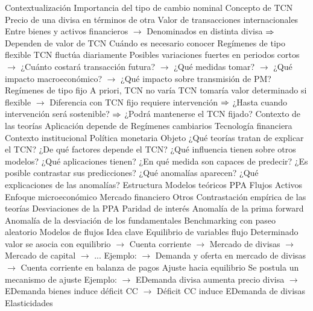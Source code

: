 \documentclass{nuevotema}
\begin{document}
\begin{esquemal}
	\1[] 
		\2 Contextualización
			\3 Importancia del tipo de cambio nominal
				\4 Concepto de TCN
				\4[] Precio de una divisa en términos de otra
				\4 Valor de transacciones internacionales
				\4[] Entre bienes y activos financieros
				\4[] $\to$ Denominados en distinta divisa
				\4[] $\Rightarrow$ Dependen de valor de TCN
			\3 Cuándo es necesario conocer
				\4 Regímenes de tipo flexible
				\4[] TCN fluctúa diariamente
				\4[] Posibles variaciones fuertes en periodos cortos
				\4[] $\to$ ¿Cuánto costará transacción futura?
				\4[] $\to$ ¿Qué medidas tomar?
				\4[] $\to$ ¿Qué impacto macroeconómico?
				\4[] $\to$ ¿Qué impacto sobre transmisión de PM?
				\4 Regímenes de tipo fijo
				\4[] A priori, TCN no varía
				\4[] TCN tomaría valor determinado si flexible
				\4[] $\to$ Diferencia con TCN fijo requiere intervención
				\4[] $\Rightarrow$ ¿Hasta cuando intervención será sostenible?
				\4[] $\Rightarrow$ ¿Podrá mantenerse el TCN fijado?
			\3 Contexto de las teorías
				\4 Aplicación depende de
				\4[] Regímenes cambiarios
				\4[] Tecnología financiera
				\4[] Contexto institucional
				\4[] Política monetaria
		\2 Objeto
			\3 ¿Qué teorías tratan de explicar el TCN?
				\4 ¿De qué factores depende el TCN?
				\4 ¿Qué influencia tienen sobre otros modelos?
				\4 ¿Qué aplicaciones tienen?
			\3 ¿En qué medida son capaces de predecir?
				\4 ¿Es posible contrastar sus predicciones?
				\4 ¿Qué anomalías aparecen?
				\4 ¿Qué explicaciones de las anomalías?
		\2 Estructura
			\3 Modelos teóricos
				\4 PPA
				\4 Flujos
				\4 Activos
				\4 Enfoque microeconómico
				\4 Mercado financiero
				\4 Otros
			\3 Contrastación empírica de las teorías
				\4 Desviaciones de la PPA
				\4 Paridad de interés
				\4 Anomalía de la prima forward
				\4 Anomalía de la desviación de los fundamentales
				\4 Benchmarking con paseo aleatorio
	\1 
		\2 Modelos de flujos
			\3 Idea clave
				\4 Equilibrio de variables flujo
				\4[] Determinado valor se asocia con equilibrio
				\4[] $\to$ Cuenta corriente
				\4[] $\to$ Mercado de divisas
				\4[] $\to$ Mercado de capital
				\4[] $\to$ ...
				\4[] Ejemplo:
				\4[] $\to$ Demanda y oferta en mercado de divisas
				\4[] $\to$ Cuenta corriente en balanza de pagos
				\4 Ajuste hacia equilibrio
				\4[] Se postula un mecanismo de ajuste
				\4[] Ejemplo:
				\4[] $\to$ EDemanda divisa aumenta precio divisa
				\4[] $\to$ EDemanda bienes induce déficit CC
				\4[] $\to$ Déficit CC induce EDemanda de divisas
			\3 Elasticidades

\end{esquemal}
\end{document}
